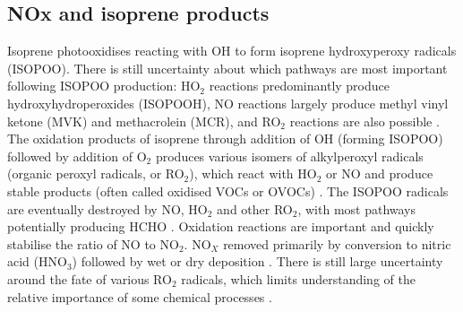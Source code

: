   \subsection{NOx and isoprene products}
    \label{Ch_LitRev:sec:IsopNox}
    Isoprene photooxidises reacting with OH to form isoprene hydroxyperoxy radicals (ISOPOO).
    There is still uncertainty about which pathways are most important following ISOPOO production: HO$_2$ reactions predominantly produce hydroxyhydroperoxides (ISOPOOH), NO reactions largely produce methyl vinyl ketone (MVK) and methacrolein (MCR), and RO$_2$ reactions are also possible \cite{Liu2016a}.
    The oxidation products of isoprene through addition of OH (forming ISOPOO) followed by addition of O$_2$ produces various isomers of alkylperoxyl radicals (organic peroxyl radicals, or RO$_2$), which react with HO$_2$ or NO and produce stable products (often called oxidised VOCs or OVOCs) \citep{Nguyen2014}.
    The ISOPOO radicals are eventually destroyed by NO, HO$_2$ and other RO$_2$, with most pathways potentially producing HCHO \citep{Wolfe2016}.
    Oxidation reactions are important and quickly stabilise the ratio of NO to NO$_2$. 
    NO$_X$ removed primarily by conversion to nitric acid (HNO$_3$) followed by wet or dry deposition \citep{Ayers2006}.
    There is still large uncertainty around the fate of various RO$_2$ radicals, which limits understanding of the relative importance of some chemical processes \citep{Crounse2013}.
    
